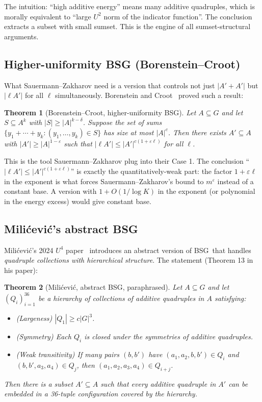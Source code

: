 \documentclass[11pt,a4paper]{article}
\theoremstyle{plain}
\newtheorem{theorem}{Theorem}[section]
\theoremstyle{definition}
\theoremstyle{remark}
\newcommand{\BSG}{\textsf{BSG}}
\begin{document}
The intuition: ``high additive energy'' means many additive quadruples, which is morally equivalent to ``large $U^2$ norm of the indicator function''. The conclusion extracts a subset with small sumset. This is the engine of all sumset-structural arguments.

\subsection{Higher-uniformity BSG (Borenstein--Croot)}

What Sauermann--Zakharov need is a version that controls not just $|A' + A'|$ but $|\ell A'|$ for all $\ell$ simultaneously. Borenstein and Croot~\cite{borensteincroot2011} proved such a result:

\begin{theorem}[Borenstein--Croot, higher-uniformity BSG]
Let $A \subseteq G$ and let $S \subseteq A^k$ with $|S| \geq |A|^{k - \delta}$. Suppose the set of sums $\{y_1 + \cdots + y_k : (y_1, \ldots, y_k) \in S\}$ has size at most $|A|^c$. Then there exists $A' \subseteq A$ with $|A'| \geq |A|^{1 - \varepsilon}$ such that $|\ell A'| \leq |A'|^{c(1 + \varepsilon \ell)}$ for all $\ell$.
\end{theorem}

This is the tool Sauermann--Zakharov plug into their Case 1. The conclusion ``$|\ell A'| \leq |A'|^{c(1 + \varepsilon \ell)}$'' is exactly the quantitatively-weak part: the factor $1 + \varepsilon \ell$ in the exponent is what forces Sauermann--Zakharov's bound to $m^\varepsilon$ instead of a constant base. A version with $1 + O(1/\log K)$ in the exponent (or polynomial in the energy excess) would give constant base.

\subsection{Milićević's abstract BSG}

Milićević's 2024 $U^4$ paper~\cite{milicevic2024} introduces an abstract version of \BSG\ that handles \emph{quadruple collections with hierarchical structure}. The statement (Theorem 13 in his paper):

\begin{theorem}[Milićević, abstract BSG, paraphrased]
Let $A \subseteq G$ and let $(Q_i)_{i=1}^{36}$ be a hierarchy of collections of additive quadruples in $A$ satisfying:
\begin{itemize}
\item (Largeness) $|Q_1| \geq c |G|^3$.
\item (Symmetry) Each $Q_i$ is closed under the symmetries of additive quadruples.
\item (Weak transitivity) If many pairs $(b, b')$ have $(a_1, a_2, b, b') \in Q_i$ and $(b, b', a_3, a_4) \in Q_j$, then $(a_1, a_2, a_3, a_4) \in Q_{i+j}$.
\end{itemize}
Then there is a subset $A' \subseteq A$ such that every additive quadruple in $A'$ can be embedded in a 36-tuple configuration covered by the hierarchy.
\end{theorem}
\end{document}
